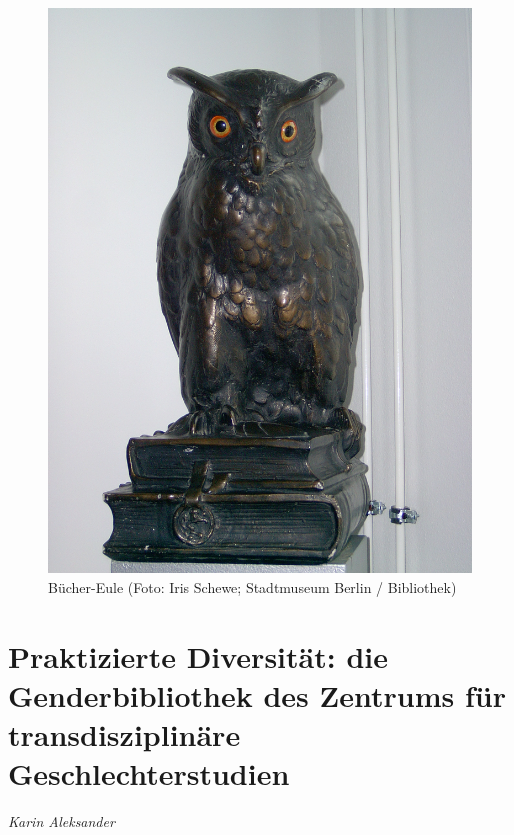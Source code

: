 \documentclass[a4paper,
fontsize=11pt,
oneside,
numbers=noperiodatend,
parskip=half-,
bibliography=totoc,
final
]{scrartcl}
\begin{document}
\begin{figure}
\centering
\includegraphics{img/Schewe_3.jpg}
\caption{Bücher-Eule (Foto: Iris Schewe; Stadtmuseum Berlin /
Bibliothek)}
\end{figure}

\hypertarget{praktizierte-diversituxe4t-die-genderbibliothek-des-zentrums-fuxfcr-transdisziplinuxe4re-geschlechterstudien}{%
\section{Praktizierte Diversität: die Genderbibliothek des
Zentrums für transdisziplinäre
Geschlechterstudien}\label{praktizierte-diversituxe4t-die-genderbibliothek-des-zentrums-fuxfcr-transdisziplinuxe4re-geschlechterstudien}}

\emph{Karin Aleksander}
\end{document}
